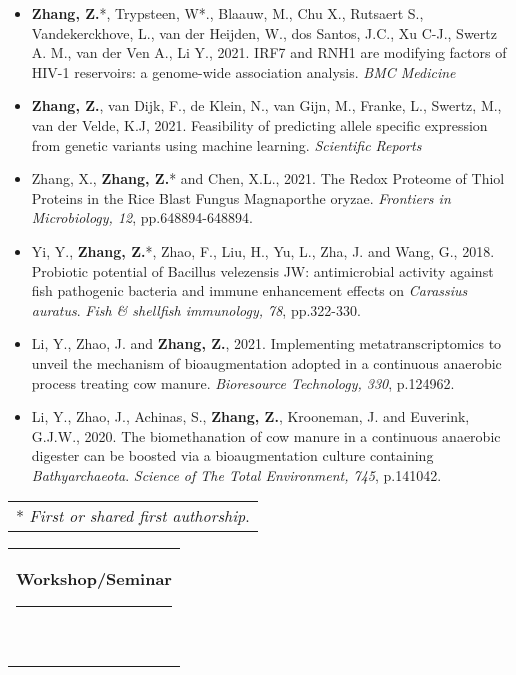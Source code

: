 \documentclass[10pt,A4,english]{article}
\newcommand{\mpwidth}{\linewidth-\fboxsep-\fboxsep}
\newcommand{\cvtext}[1] {
	\begin{tabular*}{1\mpwidth}{p{0.98\mpwidth}}
		\parbox{1\mpwidth}{#1}
	\end{tabular*}
}
\newcommand{\cvtextsmall}[1] {
	\begin{tabular*}{0.8\mpwidth}{p{0.8\mpwidth}}
		\parbox{0.8\mpwidth}{#1}
	\end{tabular*}
}
\newcommand{\cvsectionsmall}[1] {
	\vspace{12pt}
	\cvtext{
		\textbf{\Large{\textcolor{darkcol}{#1}}}\\[-4pt]
		\textcolor{accentcol}{ \rule{0.2\textwidth}{1.5pt} } \\
	}
}
\begin{document}
\begin{paracol}{2}
\begin{rightcolumn}
\begin{itemize}[leftmargin=*]
  \item \textbf{Zhang, Z.}*, Trypsteen, W*., Blaauw, M., Chu X., Rutsaert S., Vandekerckhove, L., van der Heijden, W., dos Santos, J.C., Xu C-J., Swertz A. M., van der Ven A., Li Y., 2021. IRF7 and RNH1 are modifying factors of HIV-1 reservoirs: a genome-wide association analysis. \textit{BMC Medicine}
  \item \textbf{Zhang, Z.}, van Dijk, F., de Klein, N., van Gijn, M., Franke, L., Swertz, M., van der Velde, K.J, 2021. Feasibility of predicting allele specific expression from genetic variants using machine learning. \textit{Scientific Reports}
  \item Zhang, X., \textbf{Zhang, Z.}* and Chen, X.L., 2021. The Redox Proteome of Thiol Proteins in the Rice Blast Fungus Magnaporthe oryzae. \textit{Frontiers in Microbiology, 12}, pp.648894-648894.
  \item Yi, Y., \textbf{Zhang, Z.}*, Zhao, F., Liu, H., Yu, L., Zha, J. and Wang, G., 2018. Probiotic potential of Bacillus velezensis JW: antimicrobial activity against fish pathogenic bacteria and immune enhancement effects on \textit{Carassius auratus}. \textit{Fish \& shellfish immunology, 78}, pp.322-330.
  \item Li, Y., Zhao, J. and \textbf{Zhang, Z.}, 2021. Implementing metatranscriptomics to unveil the mechanism of bioaugmentation adopted in a continuous anaerobic process treating cow manure. \textit{Bioresource Technology, 330}, p.124962.
  \item Li, Y., Zhao, J., Achinas, S., \textbf{Zhang, Z.}, Krooneman, J. and Euverink, G.J.W., 2020. The biomethanation of cow manure in a continuous anaerobic digester can be boosted via a bioaugmentation culture containing \textit{Bathyarchaeota}. \textit{Science of The Total Environment, 745}, p.141042.
\end{itemize}



\cvtextsmall{* \textit{First or shared first authorship}.}


\newpage
\vspace{5pt}
\cvsectionsmall{Workshop/Seminar}


\end{rightcolumn}
\end{paracol}
\end{document}
